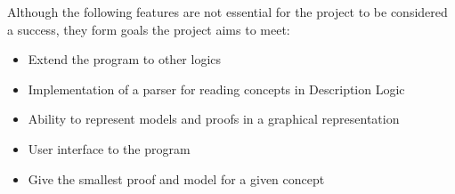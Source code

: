 
Although the following features are not essential for the project to be considered a success, they
form goals the project aims to meet:

\begin{itemize}
\item Extend the program to other logics
\item Implementation of a parser for reading concepts in Description Logic
\item Ability to represent models and proofs in a graphical representation
\item User interface to the program
\item Give the smallest proof and model for a given concept
\end{itemize}
